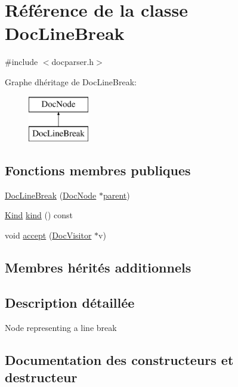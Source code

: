 \hypertarget{class_doc_line_break}{}\section{Référence de la classe Doc\+Line\+Break}
\label{class_doc_line_break}


{\ttfamily \#include $<$docparser.\+h$>$}

Graphe d\textquotesingle{}héritage de Doc\+Line\+Break\+:\begin{figure}[H]
\begin{center}
\leavevmode
\includegraphics[height=2.000000cm]{class_doc_line_break}
\end{center}
\end{figure}
\subsection*{Fonctions membres publiques}
\begin{DoxyCompactItemize}
\item 
\hyperlink{class_doc_line_break_a1c48d51e307e4282afdcf33ed94b6c01}{Doc\+Line\+Break} (\hyperlink{class_doc_node}{Doc\+Node} $\ast$\hyperlink{class_doc_node_a990d8b983962776a647e6231d38bd329}{parent})
\item 
\hyperlink{class_doc_node_aebd16e89ca590d84cbd40543ea5faadb}{Kind} \hyperlink{class_doc_line_break_ab73512b9c677bc609409356e330301fc}{kind} () const 
\item 
void \hyperlink{class_doc_line_break_aa5f5795df35745cb45db9e77aeda2186}{accept} (\hyperlink{class_doc_visitor}{Doc\+Visitor} $\ast$v)
\end{DoxyCompactItemize}
\subsection*{Membres hérités additionnels}


\subsection{Description détaillée}
Node representing a line break 

\subsection{Documentation des constructeurs et destructeur}
\hypertarget{class_doc_line_break_a1c48d51e307e4282afdcf33ed94b6c01}{}
